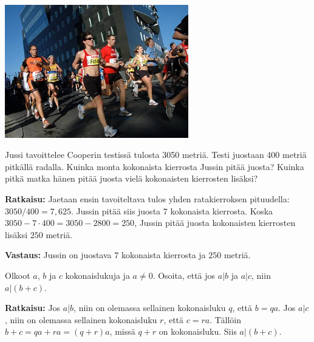 \begin{center}
\includegraphics[width=8cm]{pictures/kuvitus/Berlin_marathon} %
\end{center}


\begin{esimerkki}
Jussi tavoittelee Cooperin testissä tulosta 3050 metriä. Testi juostaan 400 metriä pitkällä
radalla. Kuinka monta kokonaista kierrosta Jussin pitää juosta? Kuinka pitkä matka
hänen pitää juosta vielä kokonaisten kierrosten lisäksi?

{\bf Ratkaisu:}
Jaetaan ensin tavoiteltava tulos yhden ratakierroksen pituudella:
$3050  / 400  = 7,625$. Jussin pitää siis juosta $7$ kokonaista kierrosta.
Koska $3050  - 7 \cdot 400 = 3050  - 2800  = 250$, Jussin pitää juosta kokonaisten kierrosten lisäksi $250$ metriä.

{\bf Vastaus:} Jussin on juostava $7$ kokonaista kierrosta ja $250$ metriä.
\end{esimerkki}

\begin{esimerkki}
Olkoot $a$, $b$ ja $c$ kokonaislukuja ja $a\neq 0$. Osoita, että jos $a|b$ ja $a|c$, niin $a|(b + c)$.

{\bf Ratkaisu:}
Jos $a|b$, niin on olemassa sellainen kokonaisluku $q$, että $b = qa$.
Jos $a|c$, niin on olemassa sellainen kokonaisluku $r$, että $c = ra$.
Tällöin $b + c = qa + ra = (q + r)a$, missä $q + r$ on kokonaisluku. 
Siis $a|(b + c)$.
\end{esimerkki}



\Harjoitustehtavat

